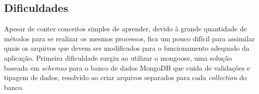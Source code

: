 \documentclass[
	12pt,				%
	oneside,			%
	a4paper,			%
	brazil				%
]{abntex2}
\begin{document}
\subsection{Dificuldades}

Apesar de conter conceitos simples de aprender, devido à grande quantidade de métodos para se realizar os mesmos processos, fica um pouco difícil para assimilar quais os arquivos que devem ser modificados para o funcionamento adequado da aplicação.
Primeira dificuldade surgiu ao utilizar o mongoose, uma solução baseada em \textit{schemas} para o banco de dados MongoDB que cuida de validações e tipagem de dados, resolvido ao criar arquivos separados para cada \textit{collection} do banco.
\end{document}
